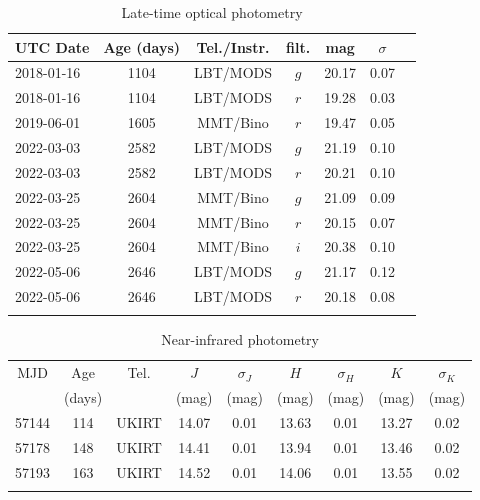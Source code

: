 \documentclass[fleqn,usenatbib,useAMS]{mnras}
\begin{document}
\begin{table}\begin{center}\begin{minipage}{3.25in}
      \caption{Late-time optical photometry}
\centering
\begin{tabular}{@{}lcccccc}\hline\hline
UTC Date &Age (days) &Tel./Instr. &filt. &mag   &$\sigma$ \\
\hline
2018-01-16  &1104 &LBT/MODS & $g$ &20.17 &0.07  \\
2018-01-16  &1104 &LBT/MODS & $r$ &19.28 &0.03  \\
2019-06-01  &1605 &MMT/Bino & $r$ & 19.47 & 0.05  \\
2022-03-03  &2582 &LBT/MODS & $g$ & 21.19 & 0.10 \\
2022-03-03  &2582 &LBT/MODS & $r$ & 20.21 &0.10  \\
2022-03-25  &2604 &MMT/Bino & $g$ & 21.09 & 0.09  \\
2022-03-25  &2604 &MMT/Bino & $r$ & 20.15  & 0.07   \\
2022-03-25  &2604 &MMT/Bino & $i$ & 20.38 &  0.10 \\
2022-05-06  &2646 &LBT/MODS & $g$ & 21.17 & 0.12 \\
2022-05-06  &2646 &LBT/MODS & $r$ & 20.18 & 0.08 \\
\hline \\
\end{tabular}
\label{tab:latephot}
\end{minipage}\end{center}
\end{table}


\begin{table}\begin{center}\begin{minipage}{3.25in}
      \caption{Near-infrared photometry}
\centering
\scriptsize
\begin{tabular}{@{}ccccccccc}\hline\hline
MJD &Age    &Tel. & $J$ & $\sigma_J$ & $H$ & $\sigma_H$ & $K$ & $\sigma_K$ \\
    &(days) & &(mag) &(mag) &(mag) &(mag) &(mag) &(mag) \\
\hline
57144 &114 &UKIRT  &14.07 &0.01 &13.63 &0.01  &13.27 &0.02 \\
57178 &148 &UKIRT  &14.41 &0.01 &13.94 &0.01 &13.46 &0.02 \\
57193 &163 &UKIRT  &14.52 &0.01 &14.06 &0.01 &13.55 &0.02 \\
\hline \\
\end{tabular}
\label{tab:ukirt}
\end{minipage}\end{center}
\end{table}
\end{document}
